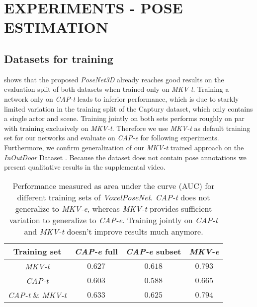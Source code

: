 \section{EXPERIMENTS - POSE ESTIMATION}

\subsection{Datasets for training}
 shows that the proposed \textit{PoseNet3D} already reaches good results on the evaluation split of both datasets when trained only on \textit{MKV-t}. Training a network only on \textit{CAP-t} leads to inferior performance, which is due to starkly limited variation in the training split of the Captury dataset, which only contains a single actor and scene. Training jointly on both sets performs roughly on par with training exclusively on \textit{MKV-t}. Therefore we use \textit{MKV-t} as default training set for our networks and evaluate on \textit{CAP-e} for following experiments. Furthermore, we confirm generalization of our \textit{MKV-t} trained approach on the \textit{InOutDoor} Dataset \cite{mees2016choosing}. Because the dataset does not contain pose annotations we present qualitative results in the supplemental video.

\begin{table}
\begin{center}
\begin{tabular}{|c|c|c|c|}
\hline
 Training set & \textit{CAP-e} full & \textit{CAP-e} subset & \textit{MKV-e} \\
\hline\hline
\textit{MKV-t}                      & $0.627$  & $0.618$  & $0.793$\\
\textit{CAP-t}                      & $0.603$  & $0.588$  & $0.665$\\
\textit{CAP-t} \& \textit{MKV-t}    & $0.633$  & $0.625$  & $0.794$\\
\hline
\end{tabular}
\caption{Performance measured as area under the curve (AUC) for different training sets of \textit{VoxelPoseNet}. \textit{CAP-t} does not generalize to \textit{MKV-e}, whereas \textit{MKV-t} provides sufficient variation to generalize to \textit{CAP-e}. Training jointly on \textit{CAP-t} and \textit{MKV-t} doesn't improve results much anymore. }\label{tab:train_sets}
\end{center}
\end{table}

